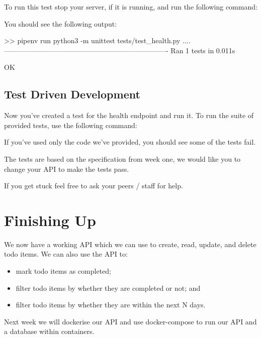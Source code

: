\documentclass{csse4400}
\begin{document}
To run this test stop your server, if it is running, and run the following command:


You should see the following output:

\begin{code}[language=bash,numbers=none]{}
  >> pipenv run python3 -m unittest tests/test_health.py
  ....
  ----------------------------------------------------------------------
  Ran 1 tests in 0.011s

  OK
\end{code}

\subsection{Test Driven Development}

Now you've created a test for the health endpoint and run it.
To run the suite of provided tests,
use the following command:


If you've used only the code we've provided,
you should see some of the tests fail.

The tests are based on the specification from week one,
we would like you to change your API to make the tests pass.


If you get stuck feel free to ask your peers / staff for help.

\section{Finishing Up}

We now have a working API which we can use to create, read, update, and delete todo items.
We can also use the API to:
\begin{itemize}
  \item mark todo items as completed;
  \item filter todo items by whether they are completed or not; and
  \item filter todo items by whether they are within the next N days.
\end{itemize}

Next week we will dockerise our API and use docker-compose to run our API and a database within containers.



\end{document}
